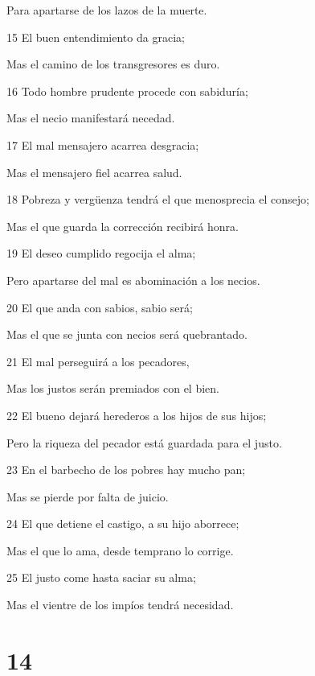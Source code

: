 \par Para apartarse de los lazos de la muerte.
\par 15 El buen entendimiento da gracia;
\par Mas el camino de los transgresores es duro.
\par 16 Todo hombre prudente procede con sabiduría;
\par Mas el necio manifestará necedad.
\par 17 El mal mensajero acarrea desgracia;
\par Mas el mensajero fiel acarrea salud.
\par 18 Pobreza y vergüenza tendrá el que menosprecia el consejo;
\par Mas el que guarda la corrección recibirá honra.
\par 19 El deseo cumplido regocija el alma;
\par Pero apartarse del mal es abominación a los necios.
\par 20 El que anda con sabios, sabio será;
\par Mas el que se junta con necios será quebrantado.
\par 21 El mal perseguirá a los pecadores,
\par Mas los justos serán premiados con el bien.
\par 22 El bueno dejará herederos a los hijos de sus hijos;
\par Pero la riqueza del pecador está guardada para el justo.
\par 23 En el barbecho de los pobres hay mucho pan;
\par Mas se pierde por falta de juicio.
\par 24 El que detiene el castigo, a su hijo aborrece;
\par Mas el que lo ama, desde temprano lo corrige.
\par 25 El justo come hasta saciar su alma;
\par Mas el vientre de los impíos tendrá necesidad.

\chapter{14}

